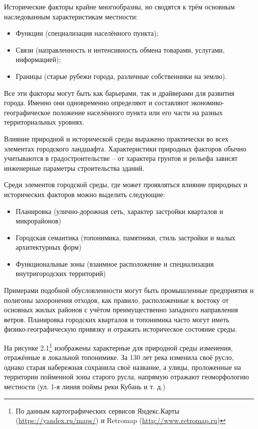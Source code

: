 \documentclass[
  11pt,
]{book}
\providecommand{\tightlist}{%
  \setlength{\itemsep}{0pt}\setlength{\parskip}{0pt}}
\begin{document}
Исторические факторы крайне многообразны, но сводятся к трём основным наследованным характеристикам местности:

\begin{itemize}
\tightlist
\item
  Функции (специализация населённого пункта);
\item
  Связи (направленность и интенсивность обмена товарами, услугами, информацией);
\item
  Границы (старые рубежи города, различные собственники на землю).
\end{itemize}

Все эти факторы могут быть как барьерами, так и драйверами для развития города. Именно они одновременно определяют и составляют экономико-географическое положение населённого пункта или его части на разных территориальных уровнях.

Влияние природной и исторической среды выражено практически во всех элементах городского ландшафта. Характеристики природных факторов обычно учитываются в градостроительстве -- от характера грунтов и рельефа зависят инженерные параметры строительства зданий.

Среди элементов городской среды, где может проявляться влияние природных и исторических факторов можно выделить следующие:

\begin{itemize}
\tightlist
\item
  Планировка (улично-дорожная сеть, характер застройки кварталов и микрорайонов)
\item
  Городская семантика (топонимика, памятники, стиль застройки и малых архитектурных форм)
\item
  Функциональные зоны (взаимное расположение и специализация внутригородских территорий)
\end{itemize}

Примерами подобной обусловленности могут быть промышленные предприятия и полигоны захоронения отходов, как правило, расположенные к востоку от основных жилых районов с учётом преимущественно западного направления ветров. Планировка городских кварталов и топонимика часто могут иметь физико-географическую привязку и отражать историческое состояние среды.

На рисунке 2.1\footnote{По данным картографических сервисов Яндекс.Карты (\url{https://yandex.ru/maps/}) и Retromap (\url{http://www.retromap.ru})} изображены характерные для природной среды изменения, отражённые в локальной топонимике. За 130 лет река изменила своё русло, однако старая набережная сохранила своё название, а улицы, проложенные на территории пойменной зоны старого русла, напрямую отражают геоморфологию местности (ул. 1-я линия поймы реки Кубань и т. д.)
\end{document}

